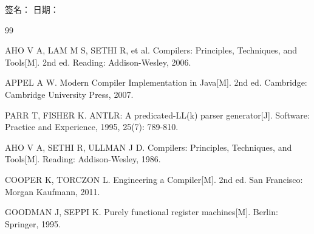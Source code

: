 \documentclass[12pt,hyperref,a4paper,UTF8]{ctexart}
\begin{document}
\vspace{2em}
\noindent 签名： \hspace{2em} 日期：

\newpage

\begin{thebibliography}{99}
\addtolength{\itemsep}{-0.5ex}

AHO V A, LAM M S, SETHI R, et al. Compilers: Principles, Techniques, and Tools[M]. 2nd ed. Reading: Addison-Wesley, 2006.

APPEL A W. Modern Compiler Implementation in Java[M]. 2nd ed. Cambridge: Cambridge University Press, 2007.

PARR T, FISHER K. ANTLR: A predicated-LL(k) parser generator[J]. Software: Practice and Experience, 1995, 25(7): 789-810.

AHO V A, SETHI R, ULLMAN J D. Compilers: Principles, Techniques, and Tools[M]. Reading: Addison-Wesley, 1986.

COOPER K, TORCZON L. Engineering a Compiler[M]. 2nd ed. San Francisco: Morgan Kaufmann, 2011.

GOODMAN J, SEPPI K. Purely functional register machines[M]. Berlin: Springer, 1995.

\end{thebibliography}
\end{document}
